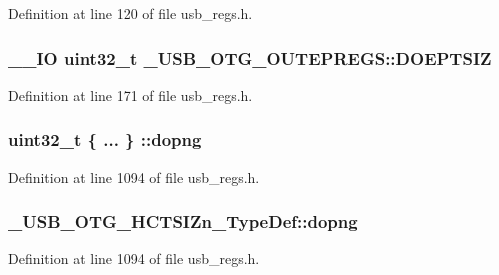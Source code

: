 Definition at line 120 of file usb\-\_\-regs.\-h.

\hypertarget{group___u_s_b___o_t_g___d_r_i_v_e_r_ga7ac3779b2ae08f30c45376e163cab08c}{
\subsubsection[{D\-O\-E\-P\-T\-S\-I\-Z}]{\setlength{\rightskip}{0pt plus 5cm}\-\_\-\-\_\-\-I\-O {\bf uint32\-\_\-t} \-\_\-\-U\-S\-B\-\_\-\-O\-T\-G\-\_\-\-O\-U\-T\-E\-P\-R\-E\-G\-S\-::\-D\-O\-E\-P\-T\-S\-I\-Z}}\label{group___u_s_b___o_t_g___d_r_i_v_e_r_ga7ac3779b2ae08f30c45376e163cab08c}


Definition at line 171 of file usb\-\_\-regs.\-h.

\hypertarget{group___u_s_b___o_t_g___d_r_i_v_e_r_ga9d0c1ac972f59113db9c527d81118226}{
\subsubsection[{dopng}]{\setlength{\rightskip}{0pt plus 5cm}uint32\-\_\-t \{ ... \} \-::dopng}}\label{group___u_s_b___o_t_g___d_r_i_v_e_r_ga9d0c1ac972f59113db9c527d81118226}


Definition at line 1094 of file usb\-\_\-regs.\-h.

\hypertarget{group___u_s_b___o_t_g___d_r_i_v_e_r_gafa9fe50afa481ae6a656a4c752827a7e}{
\subsubsection[{dopng}]{ \-\_\-\-U\-S\-B\-\_\-\-O\-T\-G\-\_\-\-H\-C\-T\-S\-I\-Zn\-\_\-\-Type\-Def\-::dopng}}\label{group___u_s_b___o_t_g___d_r_i_v_e_r_gafa9fe50afa481ae6a656a4c752827a7e}


Definition at line 1094 of file usb\-\_\-regs.\-h.

